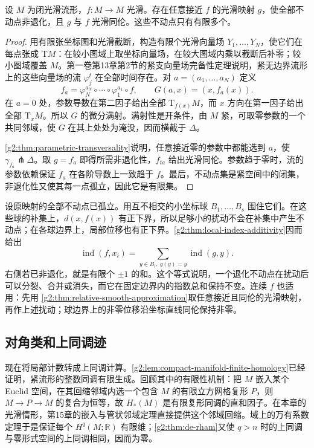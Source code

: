 \begin{lemma}\label{g2:lem:nondegenerate-fixed-point-perturbation}
	设 \(M\) 为闭光滑流形，\(f:M\to M\) 光滑。存在任意接近 \(f\) 的光滑映射 \(g\)，使全部不动点非退化，且 \(g\) 与 \(f\) 光滑同伦。这些不动点只有有限多个。
\end{lemma}
\begin{proof}
	用有限张坐标图和光滑截断，构造有限个光滑向量场 \(Y_1,\ldots,Y_N\)，使它们在每点张成 \(\mathrm{T}M\)：在较小图域上取坐标向量场，在较大图域内乘以截断后补零；较小图域覆盖 \(M\)。第一卷第13章第2节的紧支向量场完备性定理说明，紧无边界流形上的这些向量场的流 \(\varphi_j^t\) 在全部时间存在。对 \(a=(a_1,\ldots,a_N)\) 定义
	\[
		f_a=\varphi_N^{a_N}\circ\cdots\circ\varphi_1^{a_1}\circ f,
		\qquad G(a,x)=(x,f_a(x)).
	\]
	在 \(a=0\) 处，参数导数在第二因子给出全部 \(\mathrm{T}_{f(x)}M\)，而 \(x\) 方向在第一因子给出全部 \(\mathrm{T}_xM\)。所以 \(G\) 的微分满射。满射性是开条件，由 \(M\) 紧，可取零参数的一个共同邻域，使 \(G\) 在其上处处为淹没，因而横截于 \(\Delta\)。

	\cref{g2:thm:parametric-transversality}说明，任意接近零的参数中都能选到 \(a\)，使 \(\gamma_{f_a}\pitchfork\Delta\)。取 \(g=f_a\) 即得所需非退化性，\(f_{ta}\) 给出光滑同伦。参数趋于零时，流的参数依赖保证 \(f_a\) 在各阶导数上一致趋于 \(f\)。最后，不动点集是紧空间中的闭集，非退化性又使其每一点孤立，因此它是有限集。
\end{proof}

设原映射的全部不动点已孤立。用互不相交的小坐标球 \(B_1,\ldots,B_s\) 围住它们。在这些球的补集上，\(d(x,f(x))\) 有正下界，所以足够小的扰动不会在补集中产生不动点；在各球边界上，局部位移也有正下界。\cref{g2:thm:local-index-additivity}因而给出
\begin{equation}\label{g2:eq:fixed-index-conservation}
	\operatorname{ind}(f,x_i)
	=\sum_{y\in B_i,\ g(y)=y}\operatorname{ind}(g,y).
\end{equation}
右侧若已非退化，就是有限个 \(\pm1\) 的和。这个等式说明，一个退化不动点在扰动后可以分裂、合并或消失，而它在固定边界内的指数总和保持不变。连续 \(f\) 也适用：先用 \cref{g2:thm:relative-smooth-approximation}取任意接近且同伦的光滑映射，再作上述扰动；球边界上的非零位移沿坐标直线同伦保持非零。

\subsection{对角类和上同调迹}
\label{g2:subsec:1604:03}

现在将局部计数转成上同调计算。\cref{g2:lem:compact-manifold-finite-homology}已经证明，紧流形的整数同调有限生成。回顾其中的有限性机制：把 \(M\) 嵌入某个 Euclid 空间，在其回缩邻域内选一个包含 \(M\) 的有限立方网格复形 \(P\)，则 \(M\to P\to M\) 的复合为恒等，故 \(H_*(M)\) 是有限复形同调的直和因子。在本章的光滑情形，第15章的嵌入与管状邻域定理直接提供这个邻域回缩。域上的万有系数定理于是保证每个 \(H^q(M;\mathbb R)\) 有限维；\cref{g2:thm:de-rham}又使 \(q>n\) 时的上同调与零形式空间的上同调相同，因而为零。

